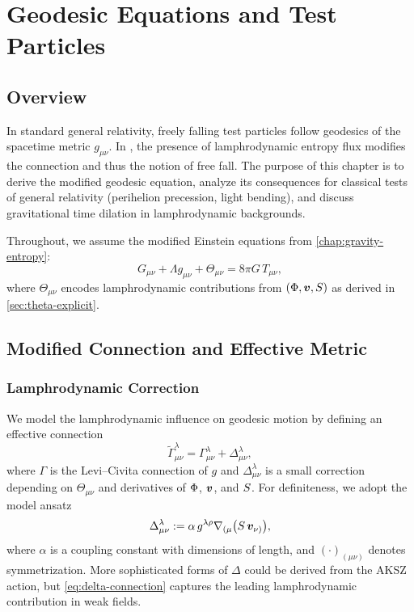 
\chapter{Geodesic Equations and Test Particles}
\label{chap:geodesics}

\section{Overview}

In standard general relativity, freely falling test particles follow
geodesics of the spacetime metric $g_{\mu\nu}$. In \rsvpabbr{}, the
presence of lamphrodynamic entropy flux modifies the connection and thus
the notion of free fall. The purpose of this chapter is to derive the
modified geodesic equation, analyze its consequences for classical
tests of general relativity (perihelion precession, light bending),
and discuss gravitational time dilation in lamphrodynamic backgrounds.

Throughout, we assume the modified Einstein equations from
\cref{chap:gravity-entropy}:
\[
  G_{\mu\nu} + \Lambda g_{\mu\nu} + \Theta_{\mu\nu} = 8\pi G\,T_{\mu\nu},
\]
where $\Theta_{\mu\nu}$ encodes lamphrodynamic contributions from
$(\Phi,\bm{v},S)$ as derived in \cref{sec:theta-explicit}.

\section{Modified Connection and Effective Metric}

\subsection{Lamphrodynamic Correction}

We model the lamphrodynamic influence on geodesic motion by defining an
effective connection
\[
  \tilde{\Gamma}^{\lambda}_{\mu\nu}
  = \Gamma^{\lambda}_{\mu\nu}
  + \Delta^{\lambda}_{\mu\nu},
\]
where $\Gamma$ is the Levi--Civita connection of $g$ and
$\Delta^{\lambda}_{\mu\nu}$ is a small correction depending on
$\Theta_{\mu\nu}$ and derivatives of $\Phi$, $\bm{v}$, and $S$.
For definiteness, we adopt the model ansatz
\begin{equation}
\label{eq:delta-connection}
  \Delta^{\lambda}_{\mu\nu}
  := \alpha\,g^{\lambda\rho}
  \nabla_{(\mu}\bigl(S\,\bm{v}_{\nu)}\bigr),
\end{equation}
where $\alpha$ is a coupling constant with dimensions of length, and
$(\cdot)_{(\mu\nu)}$ denotes symmetrization. More sophisticated forms of
$\Delta$ could be derived from the AKSZ action, but \eqref{eq:delta-connection}
captures the leading lamphrodynamic contribution in weak fields.

